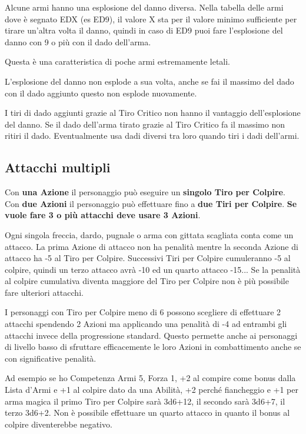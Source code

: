 \begin{multicols}{2}
Alcune armi hanno una esplosione del danno diversa. Nella tabella delle armi dove è segnato EDX (es ED9), il valore X sta per il valore minimo sufficiente per tirare un'altra volta il danno, quindi in caso di ED9 puoi fare l'esplosione del danno con 9 o più con il dado dell'arma.

Questa è una caratteristica di poche armi estremamente letali.

L'esplosione del danno non esplode a sua volta, anche se fai il massimo del dado con il dado aggiunto questo non esplode nuovamente.

I tiri di dado aggiunti grazie al Tiro Critico non hanno il vantaggio dell'esplosione del danno. Se il dado dell'arma tirato grazie al Tiro Critico fa il massimo non ritiri il dado. Eventualmente usa dadi diversi tra loro quando tiri i dadi dell'armi.


\subsection{Attacchi multipli}\label{attacchimultiplimischia}\hypertarget{attacchimultiplimischia}{}
Con \textbf{una Azione} il personaggio può eseguire un \textbf{singolo Tiro per Colpire}.
Con \textbf{due Azioni} il personaggio può effettuare fino a \textbf{due Tiri per Colpire}. \textbf{Se vuole fare 3 o più attacchi deve usare 3 Azioni}.

Ogni singola freccia, dardo, pugnale o arma con gittata scagliata conta come un attacco.
La prima Azione di attacco non ha penalità mentre la seconda Azione di attacco ha -5 al Tiro per Colpire. Successivi Tiri per Colpire cumuleranno -5 al colpire, quindi un terzo attacco avrà -10 ed un quarto attacco -15...
Se la penalità al colpire cumulativa diventa maggiore del Tiro per Colpire non è più possibile fare ulteriori attacchi.

I personaggi con Tiro per Colpire meno di 6 possono scegliere di effettuare 2 attacchi spendendo 2 Azioni ma applicando una penalità di -4 ad entrambi gli attacchi invece della progressione standard. Questo permette anche ai personaggi di livello basso di sfruttare efficacemente le loro Azioni in combattimento anche se con significative penalità.

\begin{changemargin}{0.3cm}{0.3cm}\begin{tcolorbox}[title = Esempio Attacco Multiplo]
Ad esempio se ho Competenza Armi 5, Forza 1, +2 al compire come bonus dalla Lista d'Armi e +1 al colpire dato da una Abilità, +2 perché fiancheggio e +1 per arma magica il primo Tiro per Colpire sarà 3d6+12, il secondo sarà 3d6+7, il terzo 3d6+2. Non è possibile effettuare un quarto attacco in quanto il bonus al colpire diventerebbe negativo.
\end{tcolorbox}\end{changemargin}


\end{multicols}

